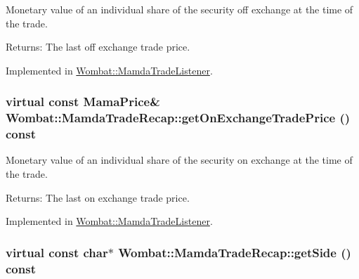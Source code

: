 Monetary value of an individual share of the security off exchange at the time of the trade. 

\begin{Desc}
\item[Returns:]The last off exchange trade price. \end{Desc}


Implemented in \hyperlink{classWombat_1_1MamdaTradeListener_71f698fe02f28a03082e13bc1712520c}{Wombat::Mamda\-Trade\-Listener}.\hypertarget{classWombat_1_1MamdaTradeRecap_9979bc1d67b53dca01261a34a06d0834}{
\subsubsection[getOnExchangeTradePrice]{\setlength{\rightskip}{0pt plus 5cm}virtual const Mama\-Price\& Wombat::Mamda\-Trade\-Recap::get\-On\-Exchange\-Trade\-Price () const}}
\label{classWombat_1_1MamdaTradeRecap_9979bc1d67b53dca01261a34a06d0834}


Monetary value of an individual share of the security on exchange at the time of the trade. 

\begin{Desc}
\item[Returns:]The last on exchange trade price. \end{Desc}


Implemented in \hyperlink{classWombat_1_1MamdaTradeListener_aa798b030e645e17bda3911d1b5a9bf9}{Wombat::Mamda\-Trade\-Listener}.\hypertarget{classWombat_1_1MamdaTradeRecap_43b14f3da3e3df82401ac524cb33f6a5}{
\subsubsection[getSide]{\setlength{\rightskip}{0pt plus 5cm}virtual const char$\ast$ Wombat::Mamda\-Trade\-Recap::get\-Side () const}}
\label{classWombat_1_1MamdaTradeRecap_43b14f3da3e3df82401ac524cb33f6a5}


